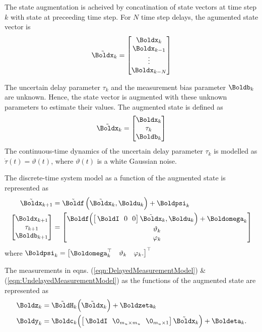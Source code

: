 The state augmentation is acheived by concatination of state vectors at time step $k$ with state at preceeding time step.
For $N$ time step delays, the agumented state vector is
\begin{align}
	\tilde{\Boldx}_k =
	\begin{bmatrix}
		\Boldx_k \\ \Boldx_{k-1} \\ \vdots \\ \Boldx_{k-N}
	\end{bmatrix} 
\end{align}


The uncertain delay parameter $\tau_k$ and the measurement bias parameter $\Boldb_k$ are unknown. Hence, the state vector is augmented with these unknown parameters to estimate their values. The augmented state is defined as
\begin{align}
	\tilde{\Boldx}_k =
	\begin{bmatrix}
		\Boldx_k \\ \tau_k \\ \Boldb_k
	\end{bmatrix} 
\end{align}
The continuous-time dynamics of the uncertain delay parameter $\tau_k$ is modelled as $\dot{\tau}(t) = \vartheta(t)$, where $\vartheta(t)$ is a white Gaussian noise. 

The discrete-time system model as a function of the augmented state is represented as
\begin{align}
	\tilde{\Boldx}_{k+1} &= 
	\tilde{\Boldf} \, \Big( \tilde{\Boldx}_k, \Boldu_k \Big) + \Boldpsi_k\\
	\begin{bmatrix}
		\Boldx_{k+1} \\ \tau_{k+1} \\ \Boldb_{k+1}
	\end{bmatrix} &= 
	\begin{bmatrix}
		\Boldf \Big( \big[\, \BoldI \ \ 0 \ \ 0 \big] \,\tilde{\Boldx}_k, \Boldu_k \Big) + \Boldomega_k \\ \vartheta_k \\ \varphi_k
	\end{bmatrix} \nonumber
\end{align}
where $\Boldpsi_k = \begin{bmatrix} \Boldomega_k^\top & \vartheta_k & \varphi_k. \end{bmatrix}^\top$

The measurements in eqns. (\ref{eqn:DelayedMeasurementModel}) \& (\ref{eqn:UndelayedMeasurementModel}) as the functions of the augmented state are represented as
\begin{align} 
	\label{eqn:DelayedMeasurementModelAug}
	\Boldz_k &= \tilde{\BoldH}_k \Big( \tilde{\Boldx}_k \Big) + \Boldzeta_k \\
	\label{eqn:UndelayedMeasurementModelAug}
	\Boldy_k &= \Boldc_k \Big( \big[\, \BoldI \ \ \0_{m_u \times m_u} \ \ \0_{m_u \times 1} \big] \,\tilde{\Boldx}_k \Big) + \Boldeta_k.
\end{align}
